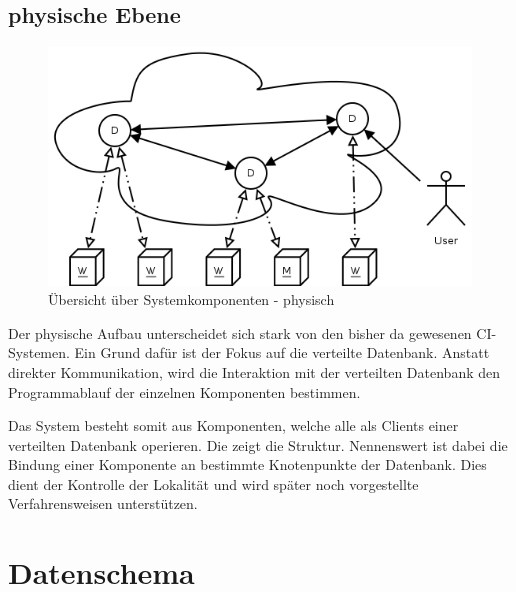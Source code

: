 

\subsection{physische Ebene}

\begin{figure}[ht] 
  \centering
  \includegraphics[width=\textwidth]{imageinput/grob-layout-komponenten.png}
  \caption{Übersicht über Systemkomponenten - physisch}
  \label{fig:grob-layout-komponenten}
\end{figure}

Der physische Aufbau unterscheidet sich stark von den bisher da gewesenen CI-Systemen.
Ein Grund dafür ist der Fokus auf die verteilte Datenbank.
Anstatt direkter Kommunikation,
wird die Interaktion mit der verteilten Datenbank den Programmablauf der einzelnen Komponenten bestimmen.

Das System besteht somit aus Komponenten, welche alle als Clients einer verteilten Datenbank operieren.
Die  zeigt die Struktur.
Nennenswert ist dabei die Bindung einer Komponente an bestimmte Knotenpunkte der Datenbank. Dies dient der Kontrolle der Lokalität und wird später noch vorgestellte Verfahrensweisen unterstützen.


\section{Datenschema}
\label{sec:design:schema}

